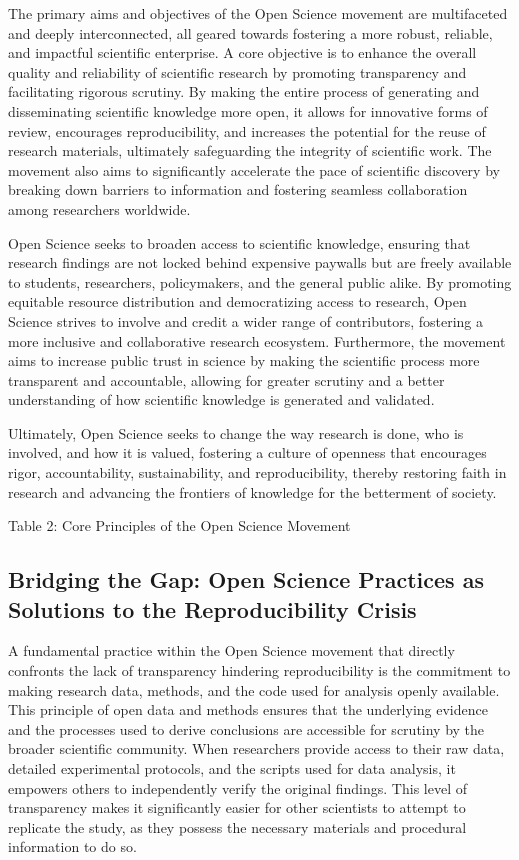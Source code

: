 \documentclass{article}
\begin{document}
The primary aims and objectives of the Open Science movement are multifaceted and deeply interconnected, all geared towards fostering a more robust, reliable, and impactful scientific enterprise. A core objective is to enhance the overall quality and reliability of scientific research by promoting transparency and facilitating rigorous scrutiny. By making the entire process of generating and disseminating scientific knowledge more open, it allows for innovative forms of review, encourages reproducibility, and increases the potential for the reuse of research materials, ultimately safeguarding the integrity of scientific work. The movement also aims to significantly accelerate the pace of scientific discovery by breaking down barriers to information and fostering seamless collaboration among researchers worldwide.

Open Science seeks to broaden access to scientific knowledge, ensuring that research findings are not locked behind expensive paywalls but are freely available to students, researchers, policymakers, and the general public alike. By promoting equitable resource distribution and democratizing access to research, Open Science strives to involve and credit a wider range of contributors, fostering a more inclusive and collaborative research ecosystem. Furthermore, the movement aims to increase public trust in science by making the scientific process more transparent and accountable, allowing for greater scrutiny and a better understanding of how scientific knowledge is generated and validated.

Ultimately, Open Science seeks to change the way research is done, who is involved, and how it is valued, fostering a culture of openness that encourages rigor, accountability, sustainability, and reproducibility, thereby restoring faith in research and advancing the frontiers of knowledge for the betterment of society.

Table 2: Core Principles of the Open Science Movement

\subsection{Bridging the Gap: Open Science Practices as Solutions to the Reproducibility Crisis}

A fundamental practice within the Open Science movement that directly confronts the lack of transparency hindering reproducibility is the commitment to making research data, methods, and the code used for analysis openly available. This principle of open data and methods ensures that the underlying evidence and the processes used to derive conclusions are accessible for scrutiny by the broader scientific community. When researchers provide access to their raw data, detailed experimental protocols, and the scripts used for data analysis, it empowers others to independently verify the original findings. This level of transparency makes it significantly easier for other scientists to attempt to replicate the study, as they possess the necessary materials and procedural information to do so.
\end{document}
